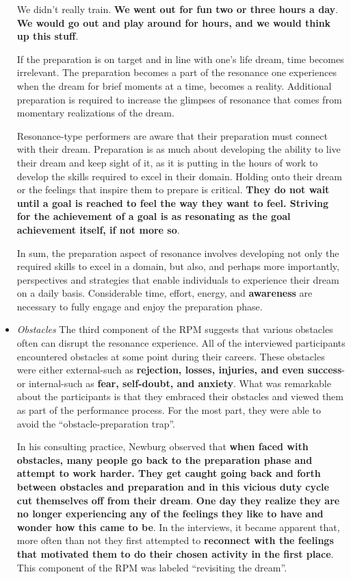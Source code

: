 \documentclass[ebook,12pt,oneside,openany]{memoir}
\begin{document}
\begin{itemize}
    \begin{displayquote}
        We didn't really train. \textbf{We went out for fun two or three hours a day}.
        \textbf{We would go out and play around for hours, and we would think up this stuff}.
    \end{displayquote}

    If the preparation is on target and in line with one's life dream, time becomes irrelevant.
    The preparation becomes a part of the resonance one experiences when the dream for brief moments at a time, 
    becomes a reality. Additional preparation is required to increase the glimpses of resonance that comes from momentary realizations of the dream.
    
    Resonance-type performers are aware that their preparation must connect with their dream.
    Preparation is as much about developing the ability to live their dream and keep sight of it, as it is putting in the hours of work to develop the skills required to excel in their domain.
    Holding onto their dream or the feelings that inspire them to prepare is critical. 
    \textbf{They do not wait until a goal is reached to feel the way they want to feel. Striving for the achievement of a goal is as resonating as the goal achievement itself, if not more so}.

    In sum, the preparation aspect of resonance involves developing not only the required skills to excel in a domain, but also, 
    and perhaps more importantly, perspectives and strategies that enable individuals to experience their dream on a daily basis.
    Considerable time, effort, energy, and \textbf{awareness} are necessary to fully engage and enjoy the preparation phase.

    \item \textit{Obstacles} The third component of the RPM suggests that various obstacles often can disrupt the resonance experience.
    All of the interviewed participants encountered obstacles at some point during their careers. 
    These obstacles were either external-such as \textbf{rejection, losses, injuries, and even success}-or internal-such as \textbf{fear, self-doubt, and anxiety}.
    What was remarkable about the participants is that they embraced their obstacles and viewed them as part of the performance process.
    For the most part, they were able to avoid the ``obstacle-preparation trap''.

    In his consulting practice, Newburg observed that \textbf{when faced with obstacles, many people go back to the preparation phase and attempt to work harder. They get caught going back and forth between obstacles and preparation and in this vicious duty cycle cut themselves off from their dream}.
    \textbf{One day they realize they are no longer experiencing any of the feelings they like to have and wonder how this came to be}.
    In the interviews, it became apparent that, more often than not they first attempted to \textbf{reconnect with the feelings that motivated them to do their chosen activity in the first place}.
    This component of the RPM was labeled ``revisiting the dream''.


\end{itemize}
\end{document}
